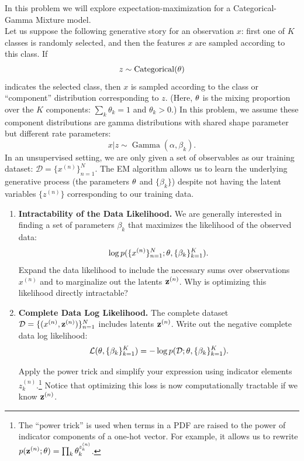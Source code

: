 \documentclass[submit]{../harvardml}
\begin{document}
\begin{problem}
  In this problem we will explore expectation-maximization for a Categorical-Gamma Mixture model. \\

  \noindent Let us suppose the following generative story for an observation $x$: first one of $K$ classes is randomly selected, and then the features $x$ are sampled according to this class. If $$z \sim \operatorname{Categorical}(\mathbf{\theta})$$ indicates the selected class, then $x$ is sampled according to the class or ``component'' distribution corresponding to $z$. (Here, $\mathbf{\theta}$ is the mixing proportion over the $K$ components: $\sum_k \theta_k = 1$ and $ \theta_k > 0$.) In this problem, we assume these component distributions are gamma distributions with shared shape parameter but different rate parameters: 
  $$ x | z \sim \operatorname{Gamma}(\alpha, \beta_k). $$
  In an unsupervised setting, we are only given a set of observables as our training dataset: $\mathcal D = \{x^{(n)}\}_{n=1}^N$. The EM algorithm allows us to learn the underlying generative process (the parameters $\mathbf{\theta}$ and $\{\beta_k\}$) despite not having the latent variables $\{z^{(n)}\}$ corresponding to our training data.

  \vspace{1em}

  \begin{enumerate}
    \item \textbf{Intractability of the Data Likelihood.} We are
    generally interested in finding a set of parameters $\beta_k$ that
    maximizes the likelihood of the observed data: $$\log
    p(\{x^{(n)}\}^N_{n=1}; \mathbf{\theta}, \{\beta_k\}^K_{k = 1}).$$ Expand the data
    likelihood to include the necessary sums over observations
    $x^{(n)}$ and to marginalize out the latents
    $\mathbf{z}^{(n)}$. Why is optimizing this likelihood directly
    intractable?

    \item \textbf{Complete Data Log Likelihood.} The complete dataset
    $\mathcal D = \{(x^{(n)}, \mathbf{z}^{(n)})\}_{n=1}^N$ includes latents $\mathbf{z}^{(n)}$. Write
    out the negative complete data log likelihood: $$\mathcal{L}(\mathbf{\theta}, \{\beta_k\}^K_{k=1}) =  -\log p(\mathcal D; \mathbf{\theta}, \{\beta_k\}^K_{k=1}).$$

    Apply the power trick and simplify your expression using indicator elements $z^{(n)}_k$.\footnote{The ``power trick'' is used when terms in a PDF are raised to the power of indicator components of a one-hot vector.  For example, it allows us to rewrite $p(\mathbf{z}^{(n)} ;  \mathbf{\theta}) = \prod_k \theta_k^{z^{(n)}_k}$.} Notice that optimizing this loss is now computationally tractable if we know $\mathbf{z}^{(n)}$.


\end{enumerate}
\end{problem}
\end{document}
